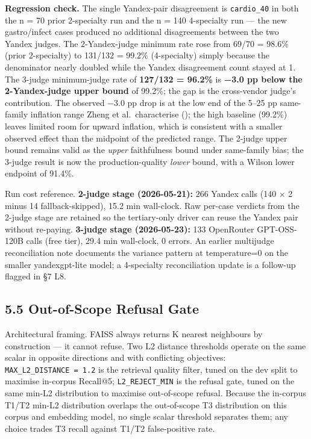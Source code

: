 \documentclass[
  american,
  a4paper,
]{article}
\begin{document}
\textbf{Regression check.} The single Yandex-pair disagreement is
\texttt{cardio\_40} in both the n = 70 prior 2-specialty run and the n =
140 4-specialty run --- the new gastro/infect cases produced no
additional disagreements between the two Yandex judges. The
2-Yandex-judge minimum rate rose from 69/70 = 98.6\% (prior 2-specialty)
to 131/132 = 99.2\% (4-specialty) simply because the denominator nearly
doubled while the Yandex disagreement count stayed at 1. The 3-judge
minimum-judge rate of \textbf{127/132 = 96.2\%} is \textbf{−3.0 pp below
the 2-Yandex-judge upper bound} of 99.2\%; the gap is the cross-vendor
judge's contribution. The observed −3.0 pp drop is at the low end of the
5--25 pp same-family inflation range Zheng et al.~characterise
(); the high baseline
(99.2\%) leaves limited room for upward inflation, which is consistent
with a smaller observed effect than the midpoint of the predicted range.
The 2-judge upper bound remains valid as the \emph{upper} faithfulness
bound under same-family bias; the 3-judge result is now the
production-quality \emph{lower} bound, with a Wilson lower endpoint of
91.4\%.

Run cost reference. \textbf{2-judge stage (2026-05-21):} 266 Yandex
calls (140 × 2 minus 14 fallback-skipped), 15.2 min wall-clock. Raw
per-case verdicts from the 2-judge stage are retained so the
tertiary-only driver can reuse the Yandex pair without re-paying.
\textbf{3-judge stage (2026-05-23):} 133 OpenRouter GPT-OSS-120B calls
(free tier), 29.4 min wall-clock, 0 errors. An earlier multijudge
reconciliation note documents the variance pattern at temperature=0 on
the smaller yandexgpt-lite model; a 4-specialty reconciliation update is
a follow-up flagged in §7 L8.

\subsection{5.5 Out-of-Scope Refusal
Gate}\label{out-of-scope-refusal-gate}

Architectural framing. FAISS always returns K nearest neighbours by
construction --- it cannot refuse. Two L2 distance thresholds operate on
the same scalar in opposite directions and with conflicting objectives:
\texttt{MAX\_L2\_DISTANCE\ =\ 1.2} is the retrieval quality filter,
tuned on the dev split to maximise in-corpus Recall@5;
\texttt{L2\_REJECT\_MIN} is the refusal gate, tuned on the same min-L2
distribution to maximise out-of-scope refusal. Because the in-corpus
T1/T2 min-L2 distribution overlaps the out-of-scope T3 distribution on
this corpus and embedding model, no single scalar threshold separates
them; any choice trades T3 recall against T1/T2 false-positive rate.
\end{document}
